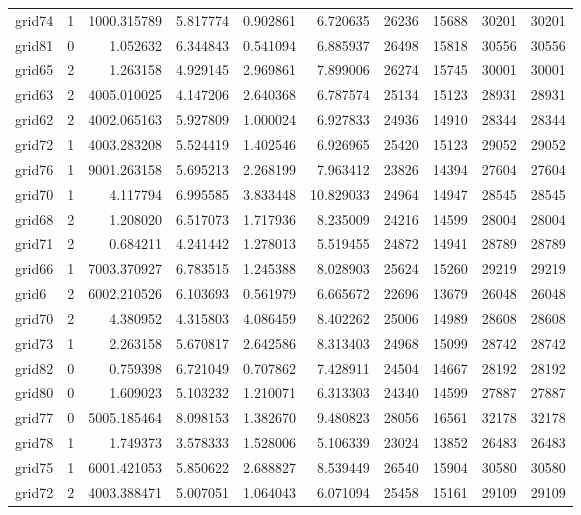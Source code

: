 \begin{longtable}{|l|r|r|r|r|r|r|r|r|r|}
grid74 & 1 & 1000.315789 & 5.817774 & 0.902861 & 6.720635 & 26236 & 15688 & 30201 & 30201 \\
grid81 & 0 & 1.052632 & 6.344843 & 0.541094 & 6.885937 & 26498 & 15818 & 30556 & 30556 \\
grid65 & 2 & 1.263158 & 4.929145 & 2.969861 & 7.899006 & 26274 & 15745 & 30001 & 30001 \\
grid63 & 2 & 4005.010025 & 4.147206 & 2.640368 & 6.787574 & 25134 & 15123 & 28931 & 28931 \\
grid62 & 2 & 4002.065163 & 5.927809 & 1.000024 & 6.927833 & 24936 & 14910 & 28344 & 28344 \\
grid72 & 1 & 4003.283208 & 5.524419 & 1.402546 & 6.926965 & 25420 & 15123 & 29052 & 29052 \\
grid76 & 1 & 9001.263158 & 5.695213 & 2.268199 & 7.963412 & 23826 & 14394 & 27604 & 27604 \\
grid70 & 1 & 4.117794 & 6.995585 & 3.833448 & 10.829033 & 24964 & 14947 & 28545 & 28545 \\
grid68 & 2 & 1.208020 & 6.517073 & 1.717936 & 8.235009 & 24216 & 14599 & 28004 & 28004 \\
grid71 & 2 & 0.684211 & 4.241442 & 1.278013 & 5.519455 & 24872 & 14941 & 28789 & 28789 \\
grid66 & 1 & 7003.370927 & 6.783515 & 1.245388 & 8.028903 & 25624 & 15260 & 29219 & 29219 \\
grid6 & 2 & 6002.210526 & 6.103693 & 0.561979 & 6.665672 & 22696 & 13679 & 26048 & 26048 \\
grid70 & 2 & 4.380952 & 4.315803 & 4.086459 & 8.402262 & 25006 & 14989 & 28608 & 28608 \\
grid73 & 1 & 2.263158 & 5.670817 & 2.642586 & 8.313403 & 24968 & 15099 & 28742 & 28742 \\
grid82 & 0 & 0.759398 & 6.721049 & 0.707862 & 7.428911 & 24504 & 14667 & 28192 & 28192 \\
grid80 & 0 & 1.609023 & 5.103232 & 1.210071 & 6.313303 & 24340 & 14599 & 27887 & 27887 \\
grid77 & 0 & 5005.185464 & 8.098153 & 1.382670 & 9.480823 & 28056 & 16561 & 32178 & 32178 \\
grid78 & 1 & 1.749373 & 3.578333 & 1.528006 & 5.106339 & 23024 & 13852 & 26483 & 26483 \\
grid75 & 1 & 6001.421053 & 5.850622 & 2.688827 & 8.539449 & 26540 & 15904 & 30580 & 30580 \\
grid72 & 2 & 4003.388471 & 5.007051 & 1.064043 & 6.071094 & 25458 & 15161 & 29109 & 29109 \\

\end{longtable}
